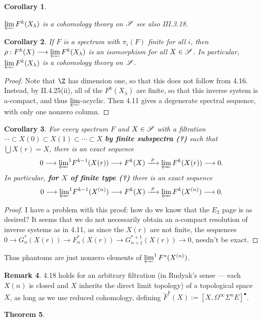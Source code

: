 \documentclass[11pt]{article}
\theoremstyle{plain}
\newtheorem{thm}{Theorem}[subsection]
\newtheorem{cor}[thm]{Corollary}
\theoremstyle{definition}
\newtheorem{rmk}[thm]{Remark}
\begin{document}
{\begin{cor}
\begin{itemise}
$\varprojlim F^k(X_\lambda)$ is a cohomology theory on $\scrS$ \lparen see also
\textup{III.3.18}\rparen.
\end{itemise}
\end{cor}
\begin{cor}
If $F$ is a spectrum with $\pi_i(F)$ finite for all $i$, then
$\rho:F^k(X)\to\varprojlim F^k(X_\lambda)$ is an isomorphism for all
$X\in\scrS$. In particular, $\varprojlim F^k(X_\lambda)$ is a cohomology theory
on $\scrS$.
\end{cor}
\begin{proof}
Note that $\Z$ has dimension one, so that this does not follow from 4.16.
Instead, by II.4.25(ii), all of the $F^k(X_\lambda)$ are finite, so that this
inverse system is a-compact, and thus $\varprojlim$-acyclic. Then 4.11 gives a
degenerate spectral sequence, with only one nonzero column.
\end{proof}
\begin{cor}
For every spectrum $F$ and $X\in\scrS$ with a filtration $\cdots\subset
X(0)\subset X(1)\subset\cdots\subset X$ \textbf{by finite subspectra
\textup{(?)}} such that $\bigcup X(r)=X$, there is an exact sequence\upcol
\[0\to{\displaystyle{\varprojlim}^1}F^{k-1}(X(r))\to F^k(X)\xrightarrow{\ \rho\
}\varprojlim F^k(X(r))\to0.\]
In particular, \textbf{for $X$ of finite type \textup{(?)}} there is an exact
sequence\upcol
\[0\to{\displaystyle{\varprojlim}^1}F^{k-1}(X^{(n)})\to F^k(X)\xrightarrow{\
\rho\ }\varprojlim F^k(X^{(n)})\to0.\]
\end{cor}
\begin{proof}
I have a problem with this proof: how do we know that the $E_2$ page is as
desired? It seems that we do not necessarily obtain an a-compact resolution of
inverse systems as in 4.11, as since the $X(r)$ are not finite, the sequences
$0\to G_n^*(X(r))\to F_n^*(X(r))\to G_{n+1}^{*+1}(X(r))\to0$, needn't be exact.
\end{proof}
\noindent
Thus phantoms are just nonzero elements of $\varprojlim^1 F^*(X^{(n)})$.
\setcounter{thm}{19}
\begin{rmk}
4.18 holds for an arbitrary filtration (in Rudyak's sense --- each $X(n)$ is
closed and $X$ inherits the direct limit topology) of a topological space $X$,
as long as we use reduced cohomology, defining
$\widetilde F^k(X):=[X,\Omega^\infty\Sigma^nE]^\bullet$.
\end{rmk}
\begin{thm}

\end{thm}}
\end{document}
